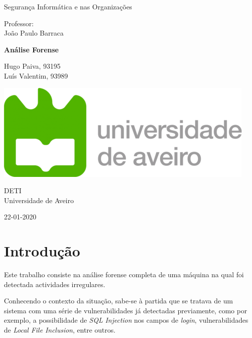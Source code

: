 \documentclass[10pt,english]{article}
\begin{document}
\begin{titlepage}
	\clearpage\thispagestyle{empty}
	\centering
	\vspace{2cm}

	
	{\Large  Segurança Informática e nas Organizações \par}
	\vspace{0.5cm}
	{\small Professor: \\
	João Paulo Barraca\par}
	\vspace{4cm}
	{\Huge \textbf{Análise Forense}} \\
	\vspace{1cm}
	\vspace{4cm}
	{\normalsize Hugo Paiva, 93195 \\ 
	             Luís Valentim, 93989
	   \par}
	\vspace{2cm}

    \includegraphics[scale=0.20]{logo_ua.png}
    
    \vspace{2cm}
    
	{\normalsize DETI \\ 
		Universidade de Aveiro \par}
		
	{\normalsize 22-01-2020 \par}
	\vspace{2cm}
		
	
	\pagebreak

\end{titlepage}
\tableofcontents{}
\clearpage

\section{Introdução}
\par Este trabalho consiste na análise forense completa de uma máquina na qual foi detectada actividades irregulares.

\par Conhecendo o contexto da situação, sabe-se à partida que se tratava de um sistema com uma série de vulnerabilidades já detectadas previamente, como por exemplo, a possibilidade de \textit{SQL Injection} nos campos de \textit{login}, vulnerabilidades de \textit{Local File Inclusion}, entre outros.
\end{document}
